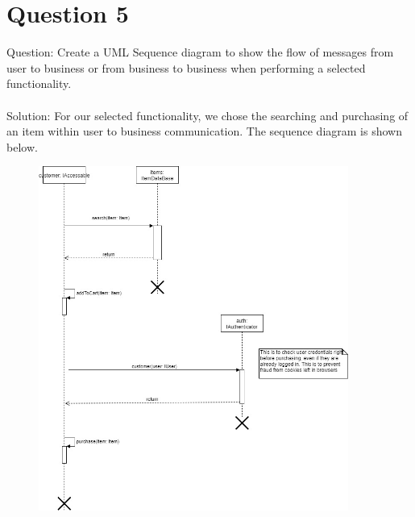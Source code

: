 \documentclass{article}
\begin{document}
\section*{Question 5}
Question: Create a UML Sequence diagram to show the flow of messages from user to business or from business to business when performing a selected functionality. \\\\
Solution: For our selected functionality, we chose the searching and purchasing of an item within user to business communication. The sequence diagram is shown below. \\
\begin{figure}[h]
	\includegraphics[width=4in]{sequence.jpg}
\end{figure}
\end{document}
